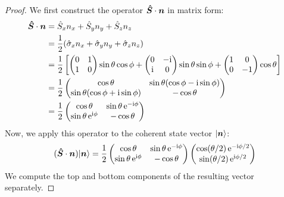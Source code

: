 \begin{proof}
    We first construct the operator $\bm{\hat{S}} \cdot \bm{n}$ in matrix form:
    \begin{equation}\begin{aligned}
        \bm{\hat{S}} \cdot \bm{n} &= \hat{S}_x n_x + \hat{S}_y n_y + \hat{S}_z n_z \\
        &= \frac{1}{2} (\hat{\sigma}_x n_x + \hat{\sigma}_y n_y + \hat{\sigma}_z n_z) \\
        &= \frac{1}{2} \left[ \begin{pmatrix} 0 & 1 \\ 1 & 0 \end{pmatrix} \sin\theta \cos\phi + \begin{pmatrix} 0 & -\mathrm{i} \\ \mathrm{i} & 0 \end{pmatrix} \sin\theta \sin\phi + \begin{pmatrix} 1 & 0 \\ 0 & -1 \end{pmatrix} \cos\theta \right] \\
        &= \frac{1}{2} \begin{pmatrix}
        \cos\theta & \sin\theta (\cos\phi - \mathrm{i} \sin\phi) \\
        \sin\theta (\cos\phi + \mathrm{i} \sin\phi) & -\cos\theta
        \end{pmatrix} \\
        &= \frac{1}{2} \begin{pmatrix}
        \cos\theta & \sin\theta \, \mathrm{e}^{-\mathrm{i}\phi} \\
        \sin\theta \, \mathrm{e}^{\mathrm{i}\phi} & -\cos\theta
        \end{pmatrix}
    \end{aligned}\end{equation}
    Now, we apply this operator to the coherent state vector $|\bm{n}\rangle$:
    \begin{equation}
        (\bm{\hat{S}} \cdot \bm{n}) |\bm{n}\rangle = \frac{1}{2} \begin{pmatrix}
        \cos\theta & \sin\theta \, \mathrm{e}^{-\mathrm{i}\phi} \\
        \sin\theta \, \mathrm{e}^{\mathrm{i}\phi} & -\cos\theta
        \end{pmatrix}
        \begin{pmatrix}
        \cos(\theta/2) \, \mathrm{e}^{-\mathrm{i}\phi/2} \\
        \sin(\theta/2) \, \mathrm{e}^{\mathrm{i}\phi/2}
        \end{pmatrix}
    \end{equation}
    We compute the top and bottom components of the resulting vector separately.


\end{proof}
